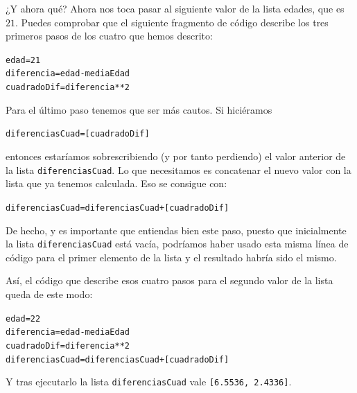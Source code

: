 \documentclass[10pt,a4paper]{article}\usepackage[]{graphicx}\usepackage[]{color}
\makeatletter
\newcommand{\hlnum}[1]{\textcolor[rgb]{0.686,0.059,0.569}{#1}}%
\newcommand{\hlopt}[1]{\textcolor[rgb]{0,0,0}{#1}}%
\newcommand{\hlstd}[1]{\textcolor[rgb]{0.345,0.345,0.345}{#1}}%
\newcommand{\hlkwb}[1]{\textcolor[rgb]{0.69,0.353,0.396}{#1}}%
\newenvironment{kframe}{%
 \def\at@end@of@kframe{}%
 \ifinner\ifhmode%
  \def\at@end@of@kframe{\end{minipage}}%
  \begin{minipage}{\columnwidth}%
 \fi\fi%
 \def\FrameCommand##1{\hskip\@totalleftmargin \hskip-\fboxsep
 \colorbox{shadecolor}{##1}\hskip-\fboxsep
     \hskip-\linewidth \hskip-\@totalleftmargin \hskip\columnwidth}%
 \MakeFramed {\advance\hsize-\width
   \@totalleftmargin\z@ \linewidth\hsize
   \@setminipage}}%
 {\par\unskip\endMakeFramed%
 \at@end@of@kframe}
\newenvironment{knitrout}{}{} %
\makeatother
\begin{document}
¿Y ahora qué? Ahora nos toca pasar al siguiente valor de la lista edades, que es $21$. Puedes comprobar que el siguiente fragmento de código describe los tres primeros pasos de los cuatro que hemos descrito:  
\begin{knitrout}
\color{fgcolor}\begin{kframe}
\begin{alltt}
\hlstd{edad} \hlkwb{=}  \hlnum{21}
\hlstd{diferencia} \hlkwb{=} \hlstd{edad} \hlopt{-} \hlstd{mediaEdad}
\hlstd{cuadradoDif} \hlkwb{=} \hlstd{diferencia}\hlopt{**}\hlnum{2}
\end{alltt}
\end{kframe}
\end{knitrout}
Para el último paso tenemos que ser más cautos. Si hiciéramos 
\begin{knitrout}
\color{fgcolor}\begin{kframe}
\begin{alltt}
diferenciasCuad = [cuadradoDif]
\end{alltt}
\end{kframe}
\end{knitrout}
entonces estaríamos sobrescribiendo (y por tanto perdiendo) el valor anterior de la lista {\tt diferenciasCuad}. Lo que necesitamos es concatenar el nuevo valor con la lista que ya tenemos calculada. Eso se consigue con:
\begin{knitrout}
\color{fgcolor}\begin{kframe}
\begin{alltt}
diferenciasCuad = diferenciasCuad + [cuadradoDif]
\end{alltt}
\end{kframe}
\end{knitrout}
De hecho, y es importante que entiendas bien este paso, puesto que inicialmente la lista {\tt diferenciasCuad} está vacía, podríamos haber usado esta misma línea de código para el primer elemento de la lista y el resultado habría sido el mismo.


Así, el código que describe esos cuatro pasos para el segundo valor de la lista queda de este modo:
\begin{knitrout}
\color{fgcolor}\begin{kframe}
\begin{alltt}
edad =  22
diferencia = edad - mediaEdad
cuadradoDif = diferencia**2
diferenciasCuad = diferenciasCuad + [cuadradoDif]
\end{alltt}
\end{kframe}
\end{knitrout}
Y tras ejecutarlo la lista {\tt diferenciasCuad} vale {\tt [6.5536, 2.4336]}.  
\end{document}
